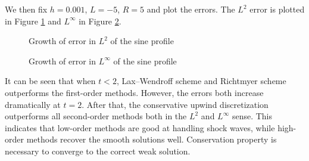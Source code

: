 \documentclass[english, nochinese]{pnote}
\begin{document}
We then fix $ h = 0.001 $, $ L = -5 $, $ R = 5 $ and plot the errors. The $L^2$ error is plotted in Figure \ref{Fig:L2} and $L^\infty$ in Figure \ref{Fig:LInf}.

\begin{figure}[htbp]
\centering

\caption{Growth of error in $L^2$ of the sine profile}
\label{Fig:L2}
\end{figure}

\begin{figure}[htbp]
\centering

\caption{Growth of error in $L^{\infty}$ of the sine profile}
\label{Fig:LInf}
\end{figure}

It can be seen that when $ t < 2 $, Lax--Wendroff scheme and Richtmyer scheme outperforms the first-order methods. However, the errors both increase dramatically at $ t = 2 $. After that, the conservative upwind discretization outperforms all second-order methods both in the $L^2$ and $L^\infty$ sense. This indicates that low-order methods are good at handling shock waves, while high-order methods recover the smooth solutions well. Conservation property is necessary to converge to the correct weak solution.
\end{document}
